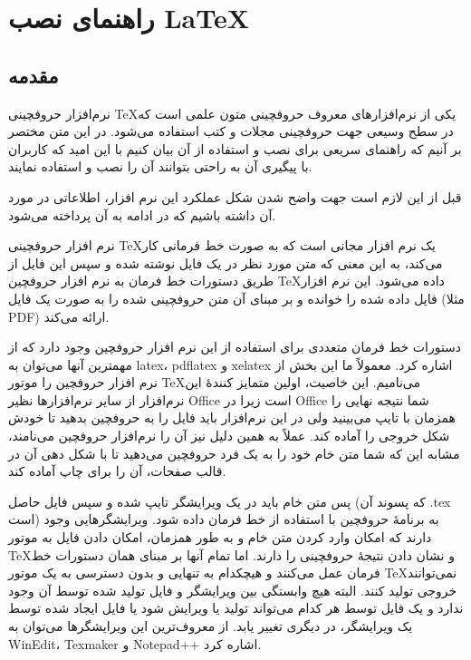 \chapter{راهنمای نصب  {\LaTeX}} %
\section{مقدمه}
نرم‌افزار حروفچینی \TeX یکی از نرم‌افزارهای معروف حروفچینی متون علمی است
که در سطح وسیعی جهت حروفچینی  مجلات و کتب استفاده می‌شود. در این متن مختصر بر آنیم
که راهنمای سریعی برای نصب و استفاده از آن بیان کنیم با این امید که کاربران با پیگیری آن
به راحتی  بتوانند آن را نصب و استفاده نمایند.

قبل از این لازم است جهت واضح شدن شکل عملکرد این نرم افزار، اطلاعاتی در مورد آن داشته
باشیم که در ادامه به آن پرداخته می‌شود.

نرم افزار حروفچینی \TeX یک نرم افزار مجانی است که به صورت خط فرمانی کار می‌کند، به این
معنی که متن مورد نظر در یک فایل نوشته شده و سپس این فایل از طریق دستورات خط
فرمان به نرم افزار حروفچین \TeX داده می‌شود. این نرم افزار فایل داده شده را خوانده و بر
مبنای آن متن حروفچینی شده را به صورت یک فایل (مثلا PDF) ارائه می‌کند.

دستورات خط فرمان متعددی برای استفاده از این نرم افزار حروفچین وجود دارد که از مهمترین 
آنها می‌توان به latex، pdflatex و xelatex اشاره کرد. معمولاً ما این بخش از
نرم افزار حروفچین را موتور \TeX می‌نامیم. این خاصیت، اولین متمایز کنندۀ این نرم‌افزار
از سایر نرم‌افزارها نظیر Office  است زیرا در Office شما نتیجه نهایی را همزمان با تایپ
 می‌بینید ولی در این نرم‌افزار باید فایل را به حروفچین بدهید تا خودش شکل خروجی را آماده
 کند. عملاً به همین دلیل نیز آن را نرم‌افزار حروفچین می‌نامند، مشابه این که شما متن خام 
 خود را به یک فرد حروفچین می‌دهید تا با شکل دهی آن در قالب صفحات، آن را برای چاپ
 آماده کند.
 
 پس متن خام باید در یک ویرایشگر تایپ شده و سپس فایل حاصل (که پسوند آن .tex است)
 به برنامۀ حروفچین
 با استفاده از خط فرمان داده شود. ویرایشگرهایی وجود دارند که امکان وارد کردن متن خام
 و به طور همزمان، امکان دادن فایل به موتور \TeX و نشان دادن نتیجۀ حروفچینی را دارند. 
 اما تمام آنها بر مبنای همان دستورات خط فرمان عمل می‌کنند و هیچکدام به تنهایی و بدون
 دسترسی به یک موتور \TeX نمی‌توانند خروجی تولید کنند. البته هیچ وابستگی بین
 ویرایشگر و فایل تولید شده توسط آن وجود ندارد و یک فایل توسط هر کدام می‌تواند 
 تولید یا ویرایش شود یا فایل ایجاد شده توسط  یک ویرایشگر، در دیگری تغییر یابد.
 از معروف‌ترین این ویرایشگرها می‌توان به WinEdit، Texmaker
و  Notepad++  اشاره کرد.

